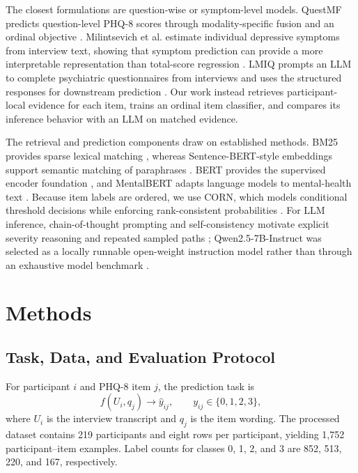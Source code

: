 \documentclass{article}
\begin{document}
The closest formulations are question-wise or symptom-level models. QuestMF predicts question-level PHQ-8 scores through modality-specific fusion and an ordinal objective \cite{mandal2025questmf}. Milintsevich et al. estimate individual depressive symptoms from interview text, showing that symptom prediction can provide a more interpretable representation than total-score regression \cite{milintsevich2023symptom}. LMIQ prompts an LLM to complete psychiatric questionnaires from interviews and uses the structured responses for downstream prediction \cite{rosenman2024lmiq}. Our work instead retrieves participant-local evidence for each item, trains an ordinal item classifier, and compares its inference behavior with an LLM on matched evidence.

The retrieval and prediction components draw on established methods. BM25 provides sparse lexical matching \cite{robertson2009probabilistic}, whereas Sentence-BERT-style embeddings support semantic matching of paraphrases \cite{reimers2019sentencebert}. BERT provides the supervised encoder foundation \cite{devlin2019bert}, and MentalBERT adapts language models to mental-health text \cite{ji2022mentalbert}. Because item labels are ordered, we use CORN, which models conditional threshold decisions while enforcing rank-consistent probabilities \cite{shi2021corn,cao2020coral}. For LLM inference, chain-of-thought prompting and self-consistency motivate explicit severity reasoning and repeated sampled paths \cite{wei2022cot,wang2022selfconsistency}; Qwen2.5-7B-Instruct was selected as a locally runnable open-weight instruction model rather than through an exhaustive model benchmark \cite{qwen2025technical}.

\section{Methods}
\label{sec:methods}

\subsection{Task, Data, and Evaluation Protocol}
\label{subsec:data-eval}
For participant $i$ and PHQ-8 item $j$, the prediction task is
\begin{equation}
  f(U_i,q_j) \rightarrow \hat{y}_{ij}, \qquad y_{ij}\in\{0,1,2,3\},
\end{equation}
where $U_i$ is the interview transcript and $q_j$ is the item wording. The processed dataset contains 219 participants and eight rows per participant, yielding 1,752 participant--item examples. Label counts for classes 0, 1, 2, and 3 are 852, 513, 220, and 167, respectively.
\end{document}
